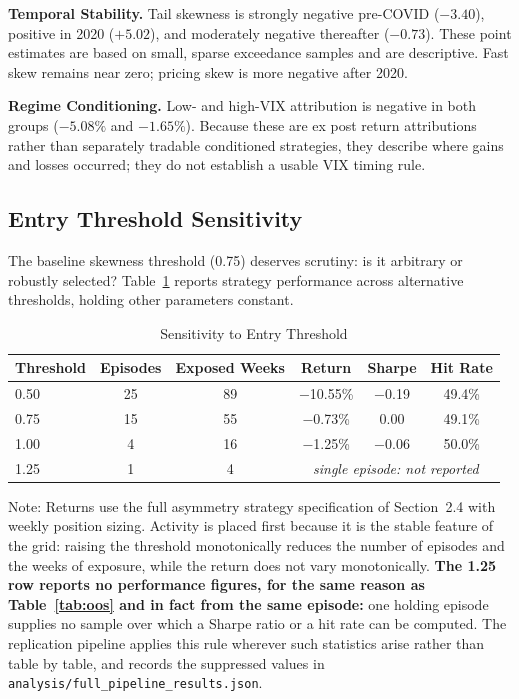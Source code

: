 \documentclass[11pt]{article}
\begin{document}
\textbf{Temporal Stability.} Tail skewness is strongly negative pre-COVID ($-3.40$), positive in 2020 ($+5.02$), and moderately negative thereafter ($-0.73$). These point estimates are based on small, sparse exceedance samples and are descriptive. Fast skew remains near zero; pricing skew is more negative after 2020.

\textbf{Regime Conditioning.} Low- and high-VIX attribution is negative in both groups ($-5.08\%$ and $-1.65\%$). Because these are ex post return attributions rather than separately tradable conditioned strategies, they describe where gains and losses occurred; they do not establish a usable VIX timing rule.

\subsection{Entry Threshold Sensitivity}

The baseline skewness threshold (0.75) deserves scrutiny: is it arbitrary or robustly selected? Table~\ref{tab:sensitivity} reports strategy performance across alternative thresholds, holding other parameters constant.

\begin{table}[H]
\centering
\caption{Sensitivity to Entry Threshold}
\label{tab:sensitivity}
\small
\begin{tabular}{@{}lccccc@{}}
\toprule
Threshold & Episodes & Exposed Weeks & Return & Sharpe & Hit Rate \\
\midrule
0.50 & 25 & 89 & $-$10.55\% & $-$0.19 & 49.4\% \\
0.75 & 15 & 55 & $-$0.73\% & 0.00 & 49.1\% \\
1.00 & 4 & 16 & $-$1.25\% & $-$0.06 & 50.0\% \\
1.25 & 1 & 4 & \multicolumn{3}{c}{\emph{single episode: not reported}} \\
\bottomrule
\end{tabular}
\par\vspace{0.3em}
\parbox{\linewidth}{\footnotesize Note: Returns use the full asymmetry strategy specification of Section~2.4 with weekly position sizing. Activity is placed first because it is the stable feature of the grid: raising the threshold monotonically reduces the number of episodes and the weeks of exposure, while the return does not vary monotonically. \textbf{The 1.25 row reports no performance figures, for the same reason as Table~\ref{tab:oos} and in fact from the same episode:} one holding episode supplies no sample over which a Sharpe ratio or a hit rate can be computed. The replication pipeline applies this rule wherever such statistics arise rather than table by table, and records the suppressed values in \texttt{analysis/full\_pipeline\_results.json}.}
\end{table}
\end{document}
